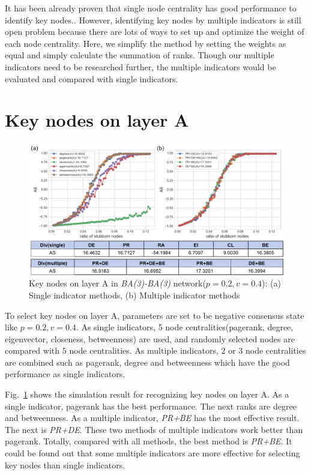 It has been already proven that single node centrality has good performance to identify key nodes.\parencite{koschutzki2008, francisco2019, bianconi2018}. However, identifying key nodes by multiple indicators is still open problem because there are lots of ways to set up and optimize the weight of each node centrality.\parencite{huang2014}  Here, we simplify the method by setting the weights as equal and simply calculate the summation of ranks. Though our multiple indicators need to be researched further, the multiple indicators would be evaluated and compared with single indicators.\\
 
\section{Key nodes on layer A}
\begin{figure}[!htb]
	\centering
	\includegraphics[width=\hsize]{figure/chap5_keynode_A.png}
	\caption{Key nodes on layer A in \textit{BA(3)-BA(3)} network($p=0.2, v=0.4$): (a) Single indicator methods, (b) Multiple indicator methods}
	\label{chap5_keynode_A}
\end{figure}
To select key nodes on layer A, parameters are set to be negative consensus state like $p=0.2, v=0.4$.  As single indicators, 5 node centralities(pagerank, degree, eigenvector, closeness, betweenness) are used, and randomly selected nodes are compared with $5$ node centralities. As multiple indicators, $2$ or $3$ node centralities are combined such as pagerank, degree and betweenness which have the good performance as single indicators. 

Fig.~\ref{chap5_keynode_A} shows the simulation result for recognizing key nodes on layer A. As a single indicator, pagerank has the best performance. The next ranks are degree and betweenness. As a multiple indicator, \textit{PR+BE} has the most effective result. The next is \textit{PR+DE}. These two methods of multiple indicators work better than pagerank. Totally, compared with all methods, the best method is \textit{PR+BE}. It could be found out that some multiple indicators are more effective for selecting key nodes than single indicators. \\

